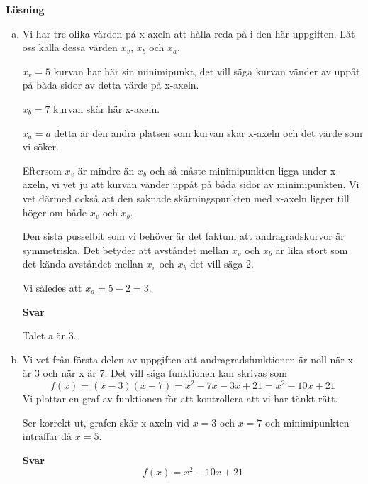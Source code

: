 \documentclass[fleqn]{article}
\begin{document}
\textbf{Lösning}
\begin{enumerate}[(a)]
\item
Vi har tre olika värden på x-axeln att hålla reda på i den här uppgiften. Låt oss kalla dessa värden $x_v$, $x_b$ och $x_a$.

$x_v = 5$ kurvan har här sin minimipunkt, det vill säga kurvan vänder av uppåt på båda sidor av detta värde på x-axeln.

$x_b = 7$ kurvan skär här x-axeln.

$x_a = a$ detta är den andra platsen som kurvan skär x-axeln och det värde som vi söker.

Eftersom $x_v$ är mindre än $x_b$ och så måste minimipunkten ligga under x-axeln, vi vet ju att kurvan vänder uppåt på båda sidor av minimipunkten. Vi vet därmed också att den saknade skärningspunkten med x-axeln ligger till höger om både $x_v$ och $x_b$.

Den sista pusselbit som vi behöver är det faktum att andragradskurvor är symmetriska. Det betyder att avståndet mellan $x_v$ och $x_b$ är lika stort som det kända avståndet mellan $x_v$ och $x_b$ det vill säga 2.

Vi således att $x_a = 5 - 2 = 3$.

\textbf{Svar}

Talet a är 3. 

\item
Vi vet från första delen av uppgiften att andragradsfunktionen är noll när x är 3 och när x är 7. Det vill säga funktionen kan skrivas som
\[
f(x) = (x-3)(x-7) = x^2 - 7x - 3x + 21 = x^2 - 10x + 21  
\]
Vi plottar en graf av funktionen för att kontrollera att vi har tänkt rätt.


Ser korrekt ut, grafen skär x-axeln vid $x=3$ och $x=7$ och minimipunkten inträffar då $x=5$.

\textbf{Svar}
\[
f(x) = x^2 - 10x + 21
\]

\end{enumerate}
\end{document}

